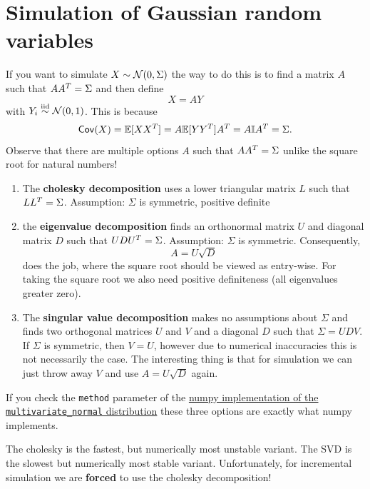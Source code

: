 \section{Simulation of Gaussian random variables}

If you want to simulate \(X\sim \mathcal{N}(0, \Sigma)\) the way to do this
is to find a matrix \(A\) such that \(A A^T = \Sigma\)
and then define
\[
	X = A Y
\]
with \(Y_i\overset{\mathrm{iid}}\sim \mathcal{N}(0,1)\). This is because
\[
	\mathsf{Cov}(X)
	= \mathbb{E}[XX^T]
	= A \mathbb{E}[YY^T] A^T
	= A \mathbb{I} A^T
	= \Sigma.
\]
Observe that there are multiple options \(A\) such that \(AA^T = \Sigma\)
unlike the square root for natural numbers!

\begin{enumerate}
	\item The \textbf{cholesky decomposition} uses a lower triangular matrix \(L\)
	such that \(LL^T = \Sigma\). Assumption: \(\Sigma\) is symmetric, positive definite
	\item the \textbf{eigenvalue decomposition} finds an orthonormal matrix \(U\) and 
	diagonal matrix \(D\) such that \(U D U^T = \Sigma\). Assumption: \(\Sigma\) is symmetric.
	Consequently,
	\[
		A = U \sqrt{D}	
	\]
	does the job, where the square root should be viewed as entry-wise. For
	taking the square root we also need positive definiteness (all eigenvalues greater zero).
	\item The \textbf{singular value decomposition} makes no assumptions about \(\Sigma\)
	and finds two orthogonal matrices \(U\) and \(V\) and a diagonal \(D\)
	such that
	\(\Sigma = U D V\).
	If \(\Sigma\) is symmetric, then \(V=U\), however due to numerical inaccuracies
	this is not necessarily the case. The interesting thing is that for simulation
	we can just throw away \(V\) and use \(A= U \sqrt{D}\) again.
\end{enumerate}

If you check the \verb|method| parameter of the
\href{https://numpy.org/doc/stable/reference/random/generated/numpy.random.Generator.multivariate_normal.html#numpy.random.Generator.multivariate_normal}{numpy implementation of the \texttt{multivariate\_normal} distribution} these three
options are exactly what numpy implements.

The cholesky is the fastest, but numerically most unstable variant. The SVD is the slowest
but numerically most stable variant.
Unfortunately, for incremental simulation we are \textbf{forced} to use the cholesky decomposition!